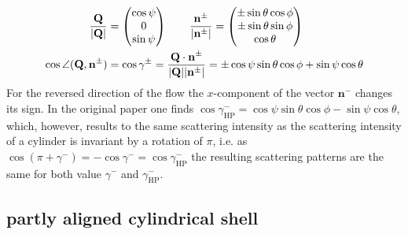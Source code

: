 \begin{align}
\frac{\mathbf{Q}}{\abs{\mathbf{Q}}} &=
\begin{pmatrix}
\cos \psi \\
0  \\
\sin \psi
\end{pmatrix} \qquad
\frac{\mathbf{n}^\pm}{\abs{\mathbf{n}^\pm}} =
\begin{pmatrix}
\pm \sin \theta \cos \phi \\
\pm \sin \theta \sin \phi  \\
\cos \theta
\end{pmatrix} \\
\cos \angle(\mathbf{Q,n}^\pm) &= \cos \gamma^\pm = \frac{\mathbf{Q\cdot n}^\pm}{\abs{\mathbf{Q}}\abs{\mathbf{n}^\pm}} =  \pm \cos\psi \sin\theta \cos\phi + \sin\psi \cos\theta
\end{align}
For the reversed direction of the flow the $x$-component of the vector $\mathbf{n}^-$ changes its sign. In the original paper \cite{Hayter1984} one finds $\cos \gamma^-_\mathrm{HP} = \cos\psi \sin\theta \cos\phi - \sin\psi \cos\theta$, which, however, results to the same scattering intensity as the scattering intensity of a cylinder is invariant by a rotation of $\pi$, i.e. as $\cos(\pi+\gamma^-) =-\cos\gamma^- = \cos\gamma^-_\mathrm{HP}$ the resulting scattering patterns are the same for both value $\gamma^-$ and $\gamma^-_\mathrm{HP}$.

\newpage
\subsection{partly aligned cylindrical shell}
\label{sect:partlyalignedCylShell}
~\\

